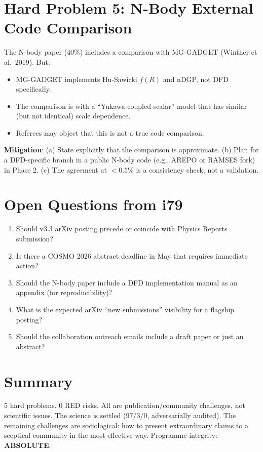 \documentclass[11pt,a4paper]{article}
\begin{document}
\section{Hard Problem 5: N-Body External Code Comparison}

The N-body paper (40\%) includes a comparison with MG-GADGET (Winther et al.\ 2019). But:
\begin{itemize}[nosep]
\item MG-GADGET implements Hu-Sawicki $f(R)$ and nDGP, not DFD specifically.
\item The comparison is with a ``Yukawa-coupled scalar'' model that has similar (but not identical) scale dependence.
\item Referees may object that this is not a true code comparison.
\end{itemize}

\textbf{Mitigation}: (a) State explicitly that the comparison is approximate. (b) Plan for a DFD-specific branch in a public N-body code (e.g., AREPO or RAMSES fork) in Phase 2. (c) The agreement at $< 0.5\%$ is a consistency check, not a validation.

\section{Open Questions from i79}

\begin{enumerate}[nosep]
\item Should v3.3 arXiv posting precede or coincide with Physics Reports submission?
\item Is there a COSMO 2026 abstract deadline in May that requires immediate action?
\item Should the N-body paper include a DFD implementation manual as an appendix (for reproducibility)?
\item What is the expected arXiv ``new submissions'' visibility for a flagship posting?
\item Should the collaboration outreach emails include a draft paper or just an abstract?
\end{enumerate}

\section{Summary}

5 hard problems. 0 RED risks. All are publication/community challenges, not scientific issues. The science is settled (97/3/0, adversarially audited). The remaining challenges are sociological: how to present extraordinary claims to a sceptical community in the most effective way. Programme integrity: \textbf{ABSOLUTE}.
\end{document}
